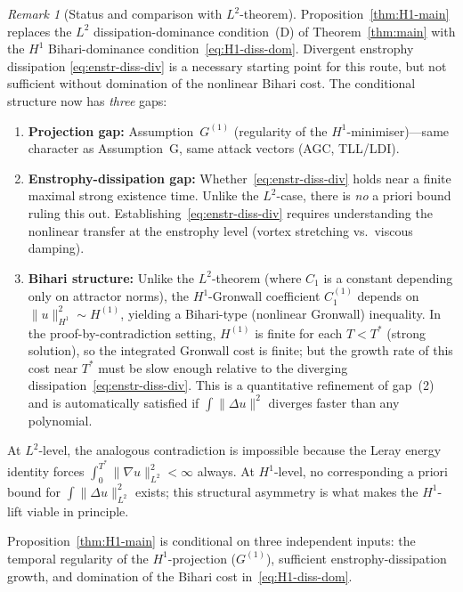 \documentclass[12pt,a4paper]{article}
\theoremstyle{definition}
\theoremstyle{plain}
\theoremstyle{remark}
\newtheorem{remark}[definition]{Remark}
\begin{document}
\begin{remark}[Status and comparison with $L^2$-theorem]
\label{rem:H1-comparison}
Proposition~\ref{thm:H1-main} replaces the $L^2$ dissipation-dominance
condition~(D) of Theorem~\ref{thm:main} with the $H^1$ Bihari-dominance
condition~\eqref{eq:H1-diss-dom}.  Divergent enstrophy dissipation
\eqref{eq:enstr-diss-div} is a necessary starting point for this route,
but not sufficient without domination of the nonlinear Bihari cost.
The conditional structure now has \emph{three} gaps:
\begin{enumerate}
  \item \textbf{Projection gap:}\; Assumption~$G^{(1)}$
    (regularity of the $H^1$-minimiser)---same character as
    Assumption~G, same attack vectors (AGC, TLL/LDI).
  \item \textbf{Enstrophy-dissipation gap:}\;
    Whether~\eqref{eq:enstr-diss-div} holds near a finite maximal strong
    existence time.
    Unlike the $L^2$-case, there is \emph{no} a priori bound
    ruling this out.  Establishing~\eqref{eq:enstr-diss-div}
    requires understanding the nonlinear transfer at the
    enstrophy level (vortex stretching vs.\ viscous damping).
  \item \textbf{Bihari structure:}\;
    Unlike the $L^2$-theorem (where $C_1$ is a constant
    depending only on attractor norms), the $H^1$-Gronwall
    coefficient $C_1^{(1)}$ depends on $\|u\|_{H^1}^2 \sim H^{(1)}$,
    yielding a Bihari-type (nonlinear Gronwall) inequality.
    In the proof-by-contradiction setting, $H^{(1)}$ is finite
    for each $T < T^*$ (strong solution), so the integrated
    Gronwall cost is finite; but the growth rate of this cost
    near $T^*$ must be slow enough relative to the diverging
    dissipation~\eqref{eq:enstr-diss-div}.  This is a quantitative
    refinement of gap~(2) and is automatically satisfied if
    $\int\|\Delta u\|^2$ diverges faster than any polynomial.
\end{enumerate}
At $L^2$-level, the analogous contradiction is impossible because
the Leray energy identity forces
$\int_0^{T^*}\|\nabla u\|_{L^2}^2 < \infty$ always.
At $H^1$-level, no corresponding a priori bound for
$\int\|\Delta u\|_{L^2}^2$ exists; this structural asymmetry
is what makes the $H^1$-lift viable in principle.

Proposition~\ref{thm:H1-main} is conditional on three independent
inputs: the temporal regularity of the $H^1$-projection
($G^{(1)}$), sufficient enstrophy-dissipation growth, and domination
of the Bihari cost in~\eqref{eq:H1-diss-dom}.


\end{remark}
\end{document}

